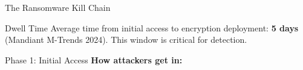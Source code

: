 \documentclass[aspectratio=169]{beamer}
\begin{document}
\begin{frame}{The Ransomware Kill Chain}

  \vspace{0.8em}
  \begin{infobox}{Dwell Time}
    Average time from initial access to encryption deployment: \textbf{5 days} (Mandiant M-Trends 2024). This window is critical for detection.
  \end{infobox}
\end{frame}

\begin{frame}{Phase 1: Initial Access}
  \textbf{How attackers get in:}


\end{frame}
\end{document}
